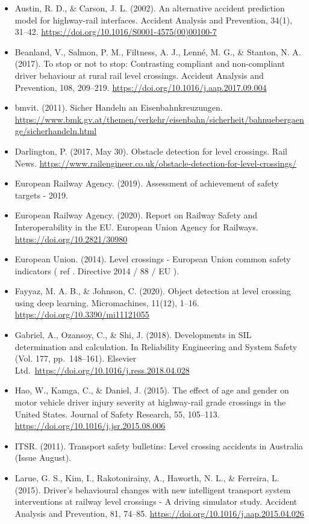 \documentclass[
]{book}
\providecommand{\tightlist}{%
  \setlength{\itemsep}{0pt}\setlength{\parskip}{0pt}}
\begin{document}
\begin{itemize}
\tightlist
\item
  Austin, R. D., \& Carson, J. L. (2002). An alternative accident prediction model for highway-rail interfaces. Accident Analysis and Prevention, 34(1), 31--42. \url{https://doi.org/10.1016/S0001-4575(00)00100-7}
\item
  Beanland, V., Salmon, P. M., Filtness, A. J., Lenné, M. G., \& Stanton, N. A. (2017). To stop or not to stop: Contrasting compliant and non-compliant driver behaviour at rural rail level crossings. Accident Analysis and Prevention, 108, 209--219. \url{https://doi.org/10.1016/j.aap.2017.09.004}
\item
  bmvit. (2011). Sicher Handeln an Eisenbahnkreuzungen. \url{https://www.bmk.gv.at/themen/verkehr/eisenbahn/sicherheit/bahnuebergaenge/sicherhandeln.html}
\item
  Darlington, P. (2017, May 30). Obstacle detection for level crossings. Rail News. \url{https://www.railengineer.co.uk/obstacle-detection-for-level-crossings/}
\item
  European Railway Agency. (2019). Assessment of achievement of safety targets - 2019.
\item
  European Railway Agency. (2020). Report on Railway Safety and Interoperability in the EU. European Union Agency for Railways. \url{https://doi.org/10.2821/30980}
\item
  European Union. (2014). Level crossings - European Union common safety indicators ( ref . Directive 2014 / 88 / EU ).
\item
  Fayyaz, M. A. B., \& Johnson, C. (2020). Object detection at level crossing using deep learning. Micromachines, 11(12), 1--16. \url{https://doi.org/10.3390/mi11121055}
\item
  Gabriel, A., Ozansoy, C., \& Shi, J. (2018). Developments in SIL determination and calculation. In Reliability Engineering and System Safety (Vol. 177, pp.~148--161). Elsevier Ltd.~\url{https://doi.org/10.1016/j.ress.2018.04.028}
\item
  Hao, W., Kamga, C., \& Daniel, J. (2015). The effect of age and gender on motor vehicle driver injury severity at highway-rail grade crossings in the United States. Journal of Safety Research, 55, 105--113. \url{https://doi.org/10.1016/j.jsr.2015.08.006}
\item
  ITSR. (2011). Transport safety bulletins: Level crossing accidents in Australia (Issue August).
\item
  Larue, G. S., Kim, I., Rakotonirainy, A., Haworth, N. L., \& Ferreira, L. (2015). Driver's behavioural changes with new intelligent transport system interventions at railway level crossings - A driving simulator study. Accident Analysis and Prevention, 81, 74--85. \url{https://doi.org/10.1016/j.aap.2015.04.026}

\end{itemize}
\end{document}
